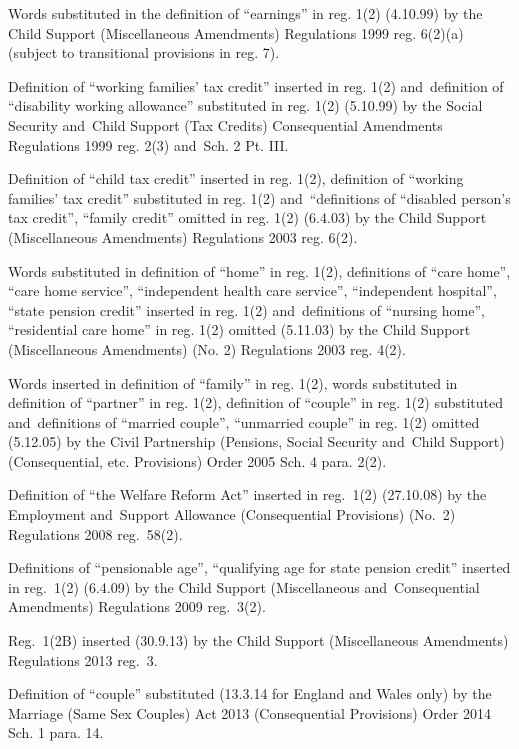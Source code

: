 \documentclass[12pt,a4paper]{article}
\begin{document}
{Words substituted in the definition of ``earnings'' in reg. 1(2) (4.10.99) by the Child Support (Miscellaneous Amendments) Regulations 1999 reg. 6(2)(a) (subject to transitional provisions in reg. 7).

Definition of ``working families' tax credit'' inserted in reg. 1(2) and~definition of ``disability working allowance'' substituted in reg. 1(2) (5.10.99) by the Social Security and~Child Support (Tax Credits) Consequential Amendments Regulations 1999 reg. 2(3) and~Sch. 2 Pt. III.

Definition of ``child tax credit'' inserted in reg. 1(2), definition of ``working families' tax credit'' substituted in reg. 1(2) and~``definitions of ``disabled person's tax credit'', ``family credit'' omitted in reg. 1(2) (6.4.03) by the Child Support (Miscellaneous Amendments) Regulations 2003 reg. 6(2).

Words substituted in definition of ``home'' in reg. 1(2), definitions of ``care home'', ``care home service'', ``independent health care service'', ``independent hospital'', ``state pension credit'' inserted in reg. 1(2) and~definitions of ``nursing home'', ``residential care home'' in reg. 1(2) omitted (5.11.03) by the Child Support (Miscellaneous Amendments) (No. 2) Regulations 2003 reg. 4(2).

Words inserted in definition of ``family'' in reg. 1(2), words substituted in definition of ``partner'' in reg. 1(2), definition of ``couple'' in reg. 1(2) substituted and~definitions of ``married couple'', ``unmarried couple'' in reg. 1(2) omitted (5.12.05) by the Civil Partnership (Pensions, Social Security and~Child Support) (Consequential, etc. Provisions) Order 2005 Sch. 4 para. 2(2).

Definition of ``the Welfare Reform Act'' inserted in reg.~1(2) (27.10.08) by the Employment and~Support Allowance (Consequential Provisions) (No.~2) Regulations 2008 reg.~58(2).

Definitions of ``pensionable age'', ``qualifying age for state pension credit'' inserted in reg.~1(2)
(6.4.09) by the Child Support (Miscellaneous and~Consequential Amendments) Regulations 2009 reg.~3(2).

Reg.~1(2B) inserted (30.9.13) by the Child Support (Miscellaneous Amendments) Regulations 2013 reg.~3.

Definition of ``couple'' substituted (13.3.14 for England and Wales only) by the Marriage (Same Sex Couples) Act 2013 (Consequential Provisions) Order 2014 Sch. 1 para. 14.
}
\end{document}
